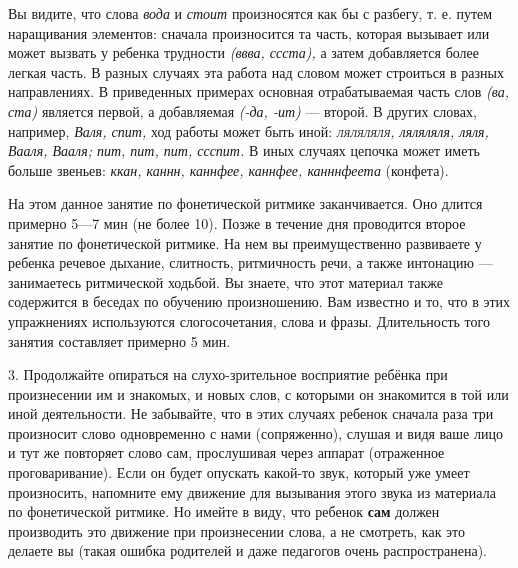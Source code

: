 \documentclass[a5paper]{book}
\renewcommand{\emph}[1]{\textit{#1}}
\begin{document}
Вы видите, что слова \emph{вода} и \emph{стоит} произносятся как бы с
разбегу, т. е. путем наращивания элементов: сначала произносится та
часть, которая вызывает или может вызвать у ребенка трудности
\emph{(ввва, ссста),} а затем добавляется более легкая часть. В разных
случаях эта работа над словом может строиться в разных направлениях. В
приведенных примерах основная отрабатываемая часть слов \emph{(ва, ста)}
является первой, а добавляемая \emph{(-да, -ит)} --- второй. В других
словах, например, \emph{Валя, спит,} ход работы может быть иной:
\emph{\textsc{ляляляля,} ляляляля, ляля, Вааля, Вааля; пит, пит, пит,
ссспит.} В иных случаях цепочка может иметь больше звеньев: \emph{ккан,
каннн, каннфее, каннфее, канннфеета} (конфета).

На этом данное занятие по фонетической ритмике заканчивается. Оно длится
примерно 5---7 мин (не более 10). Позже в течение дня проводится второе
занятие по фонетической ритмике. На нем вы преимущественно развиваете у
ребенка речевое дыхание, слитность, ритмичность речи, а также интонацию
--- занимаетесь ритмической ходьбой. Вы знаете, что этот материал также
содержится в беседах по обучению произношению. Вам известно и то, что в
этих упражнениях используются слогосочетания, слова и фразы.
Длительность того занятия составляет примерно 5 мин.

3. Продолжайте опираться на слухо-зрительное восприятие ребёнка при
произнесении им и знакомых, и новых слов, с которыми он знакомится в той
или иной деятельности. Не забывайте, что в этих случаях ребенок сначала
раза три произносит слово одновременно с нами (сопряженно), слушая и
видя ваше лицо и тут же повторяет слово сам, прослушивая через аппарат
(отраженное проговаривание). Если он будет опускать какой-то звук,
который уже умеет произносить, напомните ему движение для вызывания
этого звука из материала по фонетической ритмике. Но имейте в виду, что
ребенок \textbf{сам} должен производить это движение при произнесении
слова, а не смотреть, как это делаете вы (такая ошибка родителей и даже
педагогов очень распространена).
\end{document}
